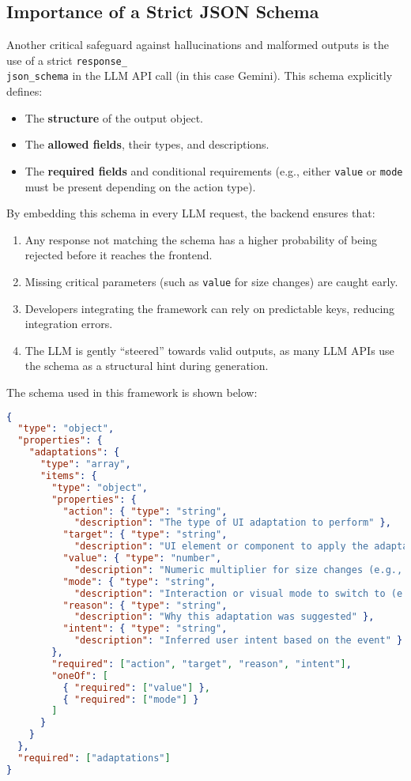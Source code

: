 \subsection{Importance of a Strict JSON Schema}
Another critical safeguard against hallucinations and malformed outputs is the use of a strict \texttt{response\_\\json\_schema} in the LLM API call (in this case Gemini). This schema explicitly defines:
\begin{itemize}
    \item The \textbf{structure} of the output object.
    \item The \textbf{allowed fields}, their types, and descriptions.
    \item The \textbf{required fields} and conditional requirements (e.g., either \texttt{value} or \texttt{mode} must be present depending on the action type).
\end{itemize}

By embedding this schema in every LLM request, the backend ensures that:
\begin{enumerate}
    \item Any response not matching the schema has a higher probability of being rejected before it reaches the frontend.
    \item Missing critical parameters (such as \texttt{value} for size changes) are caught early.
    \item Developers integrating the framework can rely on predictable keys, reducing integration errors.
    \item The LLM is gently “steered” towards valid outputs, as many LLM APIs use the schema as a structural hint during generation.
\end{enumerate}

The schema used in this framework is shown below:

\begin{lstlisting}[language=json,caption={SIF LLM Output JSON Schema}]
{
  "type": "object",
  "properties": {
    "adaptations": {
      "type": "array",
      "items": {
        "type": "object",
        "properties": {
          "action": { "type": "string",
            "description": "The type of UI adaptation to perform" },
          "target": { "type": "string",
            "description": "UI element or component to apply the adaptation to, 'all' is allowed" },
          "value": { "type": "number",
            "description": "Numeric multiplier for size changes (e.g., 1.5 for 50% larger)" },
          "mode": { "type": "string",
            "description": "Interaction or visual mode to switch to (e.g., 'voice')" },
          "reason": { "type": "string",
            "description": "Why this adaptation was suggested" },
          "intent": { "type": "string",
            "description": "Inferred user intent based on the event" }
        },
        "required": ["action", "target", "reason", "intent"],
        "oneOf": [
          { "required": ["value"] },
          { "required": ["mode"] }
        ]
      }
    }
  },
  "required": ["adaptations"]
}
\end{lstlisting}

